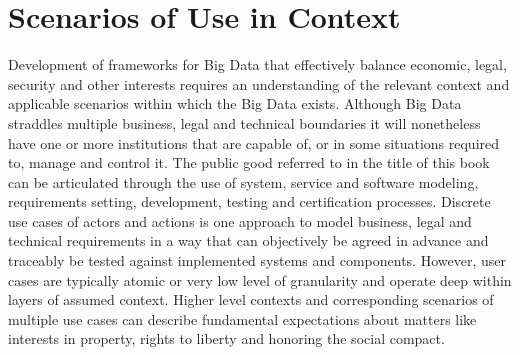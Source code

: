  \section{Scenarios of Use in Context }

Development of frameworks for Big Data that effectively balance economic, legal, security and other interests requires an understanding of the relevant context and applicable  scenarios within which the Big Data exists. Although Big Data straddles multiple business, legal and technical boundaries it will nonetheless have one or more institutions that are capable of, or in some situations required to, manage and control it.  The public good referred to in the title of this book can be articulated through the use of system, service and software modeling, requirements setting, development, testing and certification processes.  Discrete use cases of actors and actions is one approach to model business, legal and technical requirements in a way that can objectively be agreed in advance and traceably be tested against implemented systems and components. However, user cases are typically atomic or very low level of granularity and operate deep within layers of assumed context.  Higher level contexts and corresponding scenarios of multiple use cases can describe fundamental expectations about matters like interests in property, rights to liberty and honoring the social compact. 

